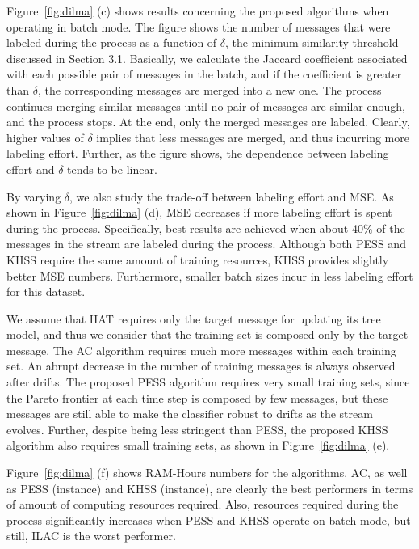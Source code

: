 \documentclass{sig-alternate}
\begin{document}
Figure~\ref{fig:dilma} (c) shows results concerning the proposed algorithms when operating in batch mode. The figure shows the number of messages that were labeled during the process as a function of $\delta$, the minimum similarity threshold discussed in Section 3.1. Basically, we calculate the Jaccard coefficient associated with each possible pair of messages in the batch, and if the coefficient is greater than $\delta$, the corresponding messages are merged into a new one. The process continues merging similar messages until no pair of messages are similar enough, and the process stops. At the end, only the merged messages are labeled. Clearly, higher values of $\delta$ implies that less messages are merged, and thus incurring more labeling effort. Further, as the figure shows, the dependence between labeling effort and $\delta$ tends to be linear.

By varying $\delta$, we also study the trade-off between labeling effort and MSE. As shown in Figure~\ref{fig:dilma} (d), MSE decreases if more labeling effort is spent during the process. Specifically, best results are achieved when about 40\% of the messages in the stream are labeled during the process. Although both PESS and KHSS require the same amount of training resources, KHSS provides slightly better MSE numbers. Furthermore, smaller batch sizes incur in less labeling effort for this dataset.

We assume that HAT requires only the target message for updating its tree model, and thus we consider that the training set is composed only by the target message. The AC algorithm requires much more
messages within each training set. An abrupt decrease in the number of training messages is always observed after drifts.
The proposed PESS algorithm requires very small training sets, since the Pareto frontier at each time step is composed by few messages, but these messages are still able to make the classifier robust to drifts as the stream evolves. Further, despite being less stringent than PESS, the proposed KHSS algorithm also requires small training sets, as shown in Figure~\ref{fig:dilma} (e).

Figure~\ref{fig:dilma} (f) shows RAM-Hours numbers for the algorithms. AC, as well as PESS (instance) and KHSS (instance), are clearly the best performers in terms of amount of computing resources required. Also, resources required during the process significantly increases when PESS and KHSS operate on batch mode, but still, ILAC is the worst performer.
\end{document}
